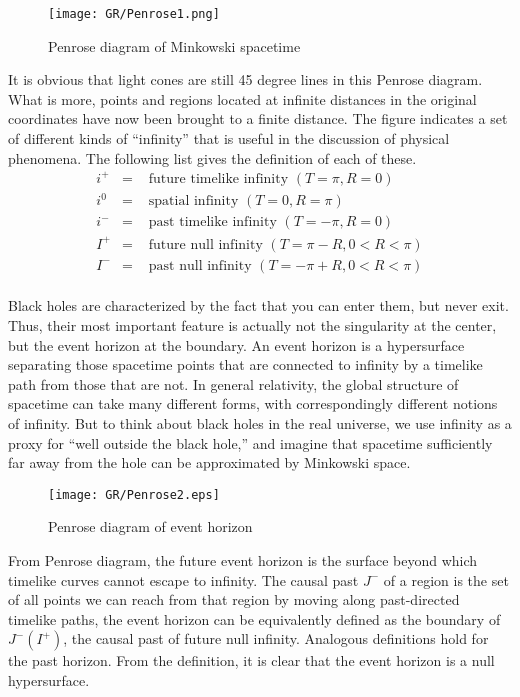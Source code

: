 \documentclass[cyan]{elegantnote}
\begin{document}
\begin{figure}
\centering
\texttt{[image: GR/Penrose1.png]}
\caption{Penrose diagram of Minkowski spacetime}
\end{figure}

\noindent
It is obvious that light cones are still 45 degree lines in this Penrose diagram. 
What is more, points and regions located at infinite distances in the original coordinates have now been brought to a finite distance. 
The figure indicates a set of different kinds of ``infinity'' that is useful in the discussion of physical phenomena. The following list gives the definition of each of these.
\begin{eqnarray}
i^{+} &=& \mbox{ future timelike infinity } (T = \pi, R = 0) \nonumber \\
i^{0} &=& \mbox{ spatial infinity } (T = 0, R = \pi) \nonumber \\
i^{-} &=& \mbox{ past timelike infinity } (T = -\pi, R = 0) \nonumber \\
I^{+} &=& \mbox{ future null infinity } (T = \pi - R, 0 < R < \pi) \nonumber \\
I^{-} &=& \mbox{ past null infinity } (T = -\pi + R, 0 < R < \pi) \nonumber
\end{eqnarray}
\\
Black holes are characterized by the fact that you can enter them, but never exit. 
Thus, their most important feature is actually not the singularity at the center, but the event horizon at the boundary. 
An event horizon is a hypersurface separating those spacetime points that are connected to infinity by a timelike path from those that are not. 
In general relativity, the global structure of spacetime can take many different forms, with correspondingly  different notions of infinity. 
But to think about black holes in the real universe, we use infinity as a proxy for ``well outside the black hole,'' and imagine that spacetime sufficiently far away from the hole can be approximated by Minkowski space.

\begin{figure}[!htb]
\centering
\texttt{[image: GR/Penrose2.eps]}
\caption{Penrose diagram of event horizon}
\end{figure}

\noindent
From Penrose diagram, the future event horizon is the surface beyond which timelike curves cannot escape to infinity. 
The causal past $J^{-}$ of a region is the set of all points we can reach from that region by moving along past-directed timelike paths, the event horizon can be
equivalently defined as the boundary of $J^{-}(I^+)$, the causal past of future null infinity. Analogous definitions hold for the past horizon. From the definition, it is clear that the event horizon is a null hypersurface.
\end{document}
